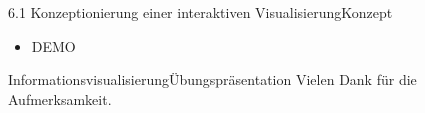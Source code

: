 \documentclass[%
11pt,a4paper,xcolor={usenames,dvipsnames}]{beamer}
\begin{document}
    \begin{frame}{6.1 Konzeptionierung einer interaktiven Visualisierung}{Konzept}
        \begin{itemize}
            \item DEMO
        \end{itemize}
    \end{frame}   
    
    \begin{frame}{Informationsvisualisierung}{Übungspräsentation}
    	Vielen Dank für die Aufmerksamkeit.
    \end{frame}
\end{document}
